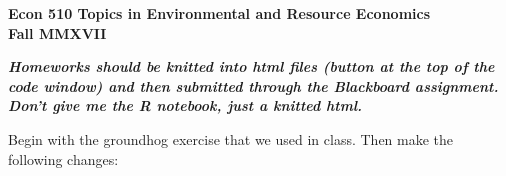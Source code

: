 \documentclass[11pt]{article}
\begin{document}
\baselineskip=12pt
\begin{center}
\textbf{Econ 510 Topics in Environmental and Resource Economics\\Fall MMXVII}
\end{center}


\smallskip

\textbf{\emph{Homeworks should be knitted into html files (button at the top of the code window) and then submitted through the Blackboard assignment. Don't give me the R notebook, just a knitted html. }}


\bigskip

Begin with the groundhog exercise that we used in class. Then make the following changes:
\end{document}
